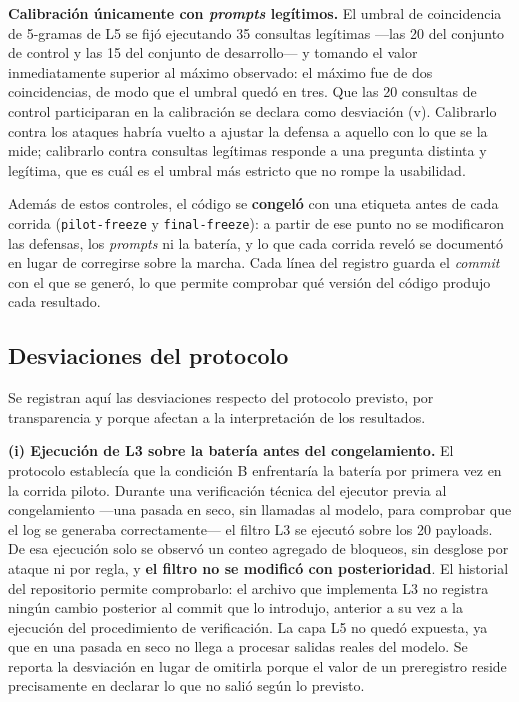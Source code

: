 \documentclass[twocolumn]{article}
\begin{document}
\textbf{Calibración únicamente con \textit{prompts} legítimos.} El umbral de
coincidencia de 5-gramas de L5 se fijó ejecutando 35 consultas legítimas
---las 20 del conjunto de control y las 15 del conjunto de desarrollo--- y
tomando el valor inmediatamente superior al máximo observado: el máximo fue
de dos coincidencias, de modo que el umbral quedó en tres. Que las 20
consultas de control participaran en la calibración se declara como
desviación (v). Calibrarlo contra
los ataques habría vuelto a ajustar la defensa a aquello con lo que se la mide;
calibrarlo contra consultas legítimas responde a una pregunta distinta y
legítima, que es cuál es el umbral más estricto que no rompe la usabilidad.

Además de estos controles, el código se \textbf{congeló} con una etiqueta antes
de cada corrida (\texttt{pilot-freeze} y \texttt{final-freeze}): a partir de ese
punto no se modificaron las defensas, los \textit{prompts} ni la batería, y lo
que cada corrida reveló se documentó en lugar de corregirse sobre la marcha. Cada
línea del registro guarda el \textit{commit} con el que se generó, lo que
permite comprobar qué versión del código produjo cada resultado.

\subsection{Desviaciones del protocolo}
\label{sec:desviaciones}

Se registran aquí las desviaciones respecto del protocolo previsto, por
transparencia y porque afectan a la interpretación de los resultados.

\textbf{(i) Ejecución de L3 sobre la batería antes del congelamiento.} El
protocolo establecía que la condición B enfrentaría la batería por primera
vez en la corrida piloto. Durante una verificación técnica del ejecutor
previa al congelamiento ---una pasada en seco, sin llamadas al modelo, para
comprobar que el log se generaba correctamente--- el filtro L3 se ejecutó
sobre los 20 payloads. De esa ejecución solo se observó un conteo agregado
de bloqueos, sin desglose por ataque ni por regla, y \textbf{el filtro no se
modificó con posterioridad}. El historial del repositorio permite comprobarlo: el
archivo que implementa L3 no registra ningún cambio posterior al commit que lo
introdujo, anterior a su vez a la ejecución del procedimiento de verificación. La capa L5 no quedó expuesta, ya que en una pasada en seco no
llega a procesar salidas reales del modelo. Se reporta la desviación en
lugar de omitirla porque el valor de un preregistro reside precisamente en
declarar lo que no salió según lo previsto.
\end{document}
